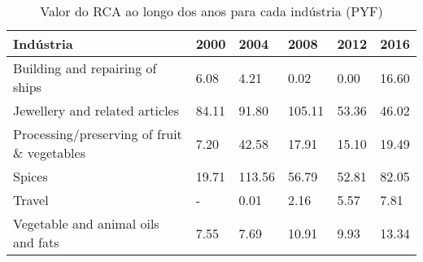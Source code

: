 \begin{table}
\centering
\caption{Valor do RCA ao longo dos anos para cada indústria (PYF)}
\label{tab:ex3-tempo-PYF}
\begin{tabular}{p{6cm}p{1.5cm}p{1.5cm}p{1.5cm}p{1.5cm}p{1.5cm}}
\toprule
                                  Indústria &  2000 &   2004 &   2008 &  2012 &  2016 \\
\midrule
            Building and repairing of ships &  6.08 &   4.21 &   0.02 &  0.00 & 16.60 \\
             Jewellery and related articles & 84.11 &  91.80 & 105.11 & 53.36 & 46.02 \\
Processing/preserving of fruit \& vegetables &  7.20 &  42.58 &  17.91 & 15.10 & 19.49 \\
                                     Spices & 19.71 & 113.56 &  56.79 & 52.81 & 82.05 \\
                                     Travel &     - &   0.01 &   2.16 &  5.57 &  7.81 \\
         Vegetable and animal oils and fats &  7.55 &   7.69 &  10.91 &  9.93 & 13.34 \\
\bottomrule
\end{tabular}
\end{table}
